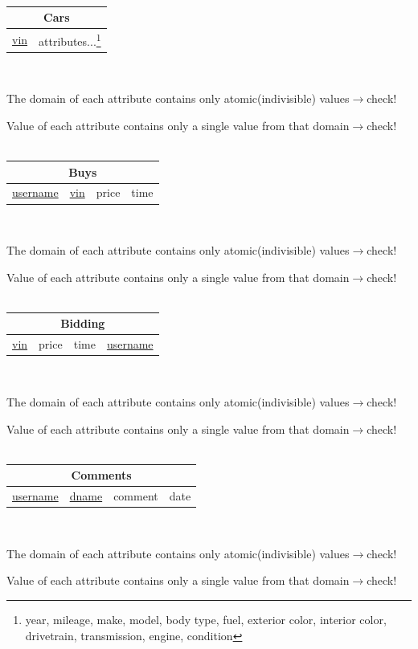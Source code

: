 \documentclass[12pt]{article}
\begin{document}
~\\
\begin{tabularx}{\textwidth}{|X|X|}
\hline
\multicolumn{2}{|c|}{Cars}\\\hline
\underline{vin} & attributes...\footnote{year, mileage, make, model, body type, fuel, exterior color, interior color, drivetrain, transmission, engine, condition}\\\hline
\end{tabularx}
~\\
\par The domain of each attribute contains only atomic(indivisible) values\hfill $\rightarrow$check!
\par Value of each attribute contains only a single value from that domain\hfill $\rightarrow$check!\\
~\\
\begin{tabularx}{\textwidth}{|X|X|X|X|}
\hline
\multicolumn{4}{|c|}{Buys}\\\hline
\underline{username} & \underline{vin} & \cellcolor{green!25}price & \cellcolor{green!25}time\\\hline
\end{tabularx}
~\\
\par The domain of each attribute contains only atomic(indivisible) values\hfill $\rightarrow$check!
\par Value of each attribute contains only a single value from that domain\hfill $\rightarrow$check!\\
~\\
\begin{tabularx}{\textwidth}{|X|X|X|X|}
\hline
\multicolumn{4}{|c|}{\cellcolor{green!25}Bidding}\\\hline
\cellcolor{green!25}\underline{vin} & \cellcolor{green!25}price & \cellcolor{green!25}time & \cellcolor{green!25}\underline{username}\\\hline
\end{tabularx}
~\\
\par The domain of each attribute contains only atomic(indivisible) values\hfill $\rightarrow$check!
\par Value of each attribute contains only a single value from that domain\hfill $\rightarrow$check!\\
~\\
\begin{tabularx}{\textwidth}{|X|X|X|X|}
\hline
\multicolumn{4}{|c|}{\cellcolor{green!25}Comments}\\\hline
\cellcolor{green!25}\underline{username} & \cellcolor{green!25}\underline{dname} & \cellcolor{green!25}comment & \cellcolor{green!25}date\\\hline
\end{tabularx}
~\\
\par The domain of each attribute contains only atomic(indivisible) values\hfill $\rightarrow$check!
\par Value of each attribute contains only a single value from that domain\hfill $\rightarrow$check!\\
\end{document}
